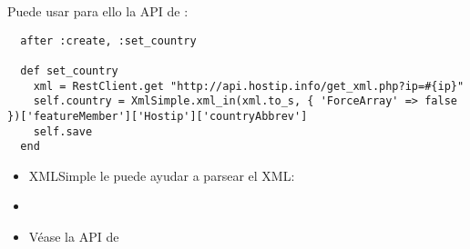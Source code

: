 Puede usar para ello la API de :

\begin{verbatim}
  after :create, :set_country
  
  def set_country
    xml = RestClient.get "http://api.hostip.info/get_xml.php?ip=#{ip}"  
    self.country = XmlSimple.xml_in(xml.to_s, { 'ForceArray' => false })['featureMember']['Hostip']['countryAbbrev']
    self.save
  end
\end{verbatim}

\begin{itemize}
\item XMLSimple le puede ayudar a parsear el XML:
\item
{}
\item Véase la API de 
\end{itemize}
